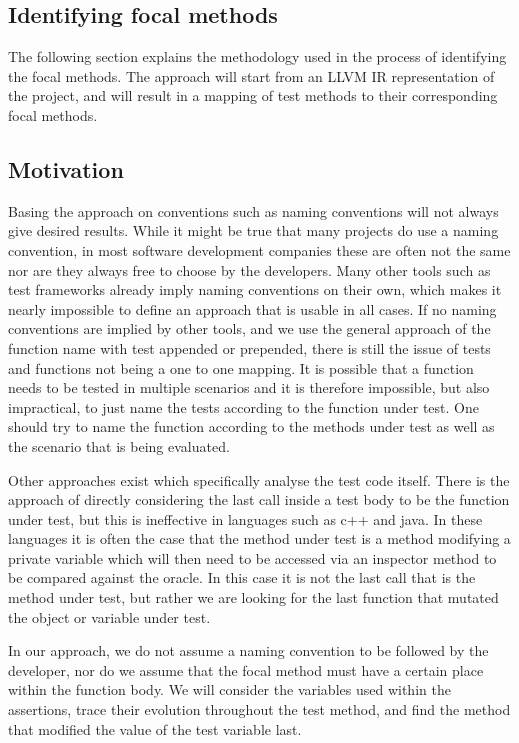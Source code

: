 \documentclass[11pt]{article}
\begin{document}
\begin{multicols}{2}
\section{Identifying focal methods}
The following section explains the methodology used in the process of identifying the focal methods. The approach will start from an LLVM IR representation of the project, and will result in a mapping of test methods to their corresponding focal methods.

\subsection{Motivation}
Basing the approach on conventions such as naming conventions will not always give desired results. While it might be true that many projects do use a naming convention, in most software development companies these are often not the same nor are they always free to choose by the developers. Many other tools such as test frameworks already imply naming conventions on their own, which makes it nearly impossible to define an approach that is usable in all cases. If no naming conventions are implied by other tools, and we use the general approach of the function name with test appended or prepended, there is still the issue of tests and functions not being a one to one mapping. It is possible that a function needs to be tested in multiple scenarios and it is therefore impossible, but also impractical, to just name the tests according to the function under test. One should try to name the function according to the methods under test as well as the scenario that is being evaluated. 

Other approaches exist which specifically analyse the test code itself. There is the approach of directly considering the last call inside a test body to be the function under test, but this is ineffective in languages such as c++ and java. In these languages it is often the case that the method under test is a method modifying a private variable which will then need to be accessed via an inspector method to be compared against the oracle. In this case it is not the last call that is the method under test, but rather we are looking for the last function that mutated the object or variable under test.

In our approach, we do not assume a naming convention to be followed by the developer, nor do we assume that the focal method must have a certain place within the function body. We will consider the variables used within the assertions, trace their evolution throughout the test method, and find the method that modified the value of the test variable last.


\end{multicols}
\end{document}
